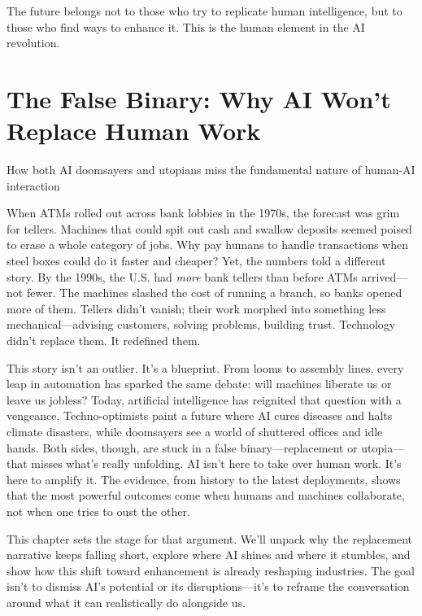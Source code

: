 \documentclass[
  Letterpaper,
]{scrbook}
\begin{document}
The future belongs not to those who try to replicate human intelligence,
but to those who find ways to enhance it. This is the human element in
the AI revolution.


\chapter{The False Binary: Why AI Won't Replace Human
Work}\label{the-false-binary-why-ai-wont-replace-human-work}

How both AI doomsayers and utopians miss the fundamental nature of
human-AI interaction

\hfill\break

When ATMs rolled out across bank lobbies in the 1970s, the forecast was
grim for tellers. Machines that could spit out cash and swallow deposits
seemed poised to erase a whole category of jobs. Why pay humans to
handle transactions when steel boxes could do it faster and cheaper?
Yet, the numbers told a different story. By the 1990s, the U.S. had
\emph{more} bank tellers than before ATMs arrived---not fewer. The
machines slashed the cost of running a branch, so banks opened more of
them. Tellers didn't vanish; their work morphed into something less
mechanical---advising customers, solving problems, building trust.
Technology didn't replace them. It redefined them.

This story isn't an outlier. It's a blueprint. From looms to assembly
lines, every leap in automation has
sparked the same debate: will machines liberate us or leave us jobless?
Today, artificial
intelligence has reignited
that question with a vengeance. Techno-optimists paint a future where AI
cures diseases and halts climate disasters, while doomsayers see a world
of shuttered offices and idle hands. Both sides, though, are stuck in a
false binary---replacement or utopia---that misses what's really
unfolding. AI isn't here to take over human work. It's here to amplify
it. The evidence, from history to the latest deployments, shows that the
most powerful outcomes come when humans and machines collaborate, not
when one tries to oust the other.

This chapter sets the stage for that argument. We'll unpack why the
replacement narrative keeps falling short, explore where AI shines and
where it stumbles, and show how this shift toward
enhancement is already
reshaping industries. The goal isn't to dismiss AI's potential or its
disruptions---it's to reframe the conversation around what it can
realistically do alongside us.
\end{document}
